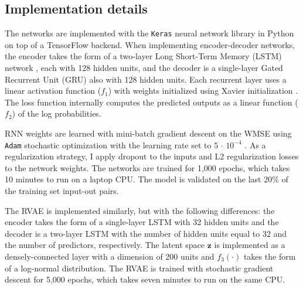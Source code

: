 \documentclass[hidelinks,12pt]{article}
\begin{document}
\newpage


\begin{singlespace}
	\begin{footnotesize}
		\begin{multicols}{2}
			
		\end{multicols}
	\end{footnotesize}
\end{singlespace}

\newpage

\begin{appendices}

\setcounter{figure}{0}
\renewcommand{\thefigure}{A\arabic{figure}}

\section{Implementation details} \label{imp}

The networks are implemented with the \texttt{Keras} neural network library \citep{chollet2015keras} in Python on top of a TensorFlow backend. When implementing encoder-decoder networks, the encoder takes the form of a two-layer Long Short-Term Memory (LSTM) network \citep{schmidhuber1997long}, each with 128 hidden units, and the decoder is a single-layer Gated Recurrent Unit (GRU) \citep{chung2014} also with 128 hidden units. Each recurrent layer uses a linear activation function ($f_1$) with weights initialized using Xavier initialization \citep{glorot2010}. The loss function internally computes the predicted outputs as a linear function ($f_2$) of the log probabilities. 

RNN weights are learned with mini-batch gradient descent on the WMSE using \texttt{Adam} stochastic optimization with the learning rate set to $5\,\cdot\,10^{-4}$ \citep{kingma2014adam}. As a regularization strategy, I apply dropout to the inputs and L2 regularization losses to the network weights. The networks are trained for 1,000 epochs, which takes 10 minutes to run on a laptop CPU. The model is validated on the last 20\% of the training set input-out pairs.  

The RVAE is implemented similarly, but with the following differences: the encoder takes the form of a single-layer LSTM with 32 hidden units and the decoder is a two-layer LSTM with the number of hidden units equal to 32 and the number of predictors, respectively. The latent space $\boldsymbol{z}$ is implemented as a densely-connected layer with a dimension of 200 units and $f_3(\cdot)$ takes the form of a log-normal distribution. The RVAE is trained with stochastic gradient descent for 5,000 epochs, which takes seven minutes to run on the same CPU.


\end{appendices}
\end{document}
